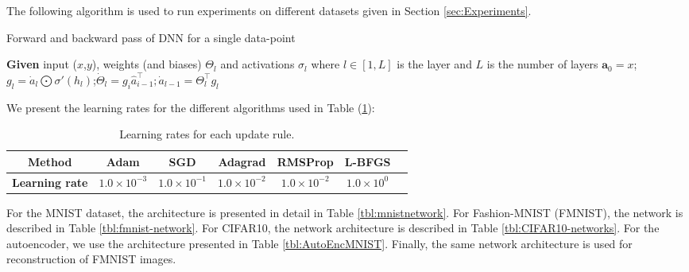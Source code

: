 The following algorithm is used to run experiments on different datasets given in Section \ref{sec:Experiments}.

\begin{algorithm}
	\caption{Forward and backward pass of DNN for a single data-point}
	\begin{algorithmic}
		\State \textbf{Given} input ($x$,$y$), weights (and biases) $\Theta_{l}$ and activations $\sigma_l$ where $l \in [1,L]$ is the layer and $L$ is the number of layers
		\State  $\mathbf{a}_0 = x$; 
		\EndFor
		 {$g_l = \dot{a}_l \bigodot \sigma'(h_l)$};{$ \dot{\Theta}_l = g_i \hat{a}^{\top}_{i-1};$}{$\dot{a}_{l-1} = \Theta_l^\top g_l$}
		\EndFor
	\end{algorithmic}\label{alg:DNN}
\end{algorithm}
We present the learning rates for the different algorithms used in Table (\ref{tbl:lr}):
\begin{table}[h]
	\centering
	\begin{tabular}{|c|c|c|c|c|c|c|}
		\hline
		\textbf{Method} & 
		Adam &  
		SGD & 
		Adagrad &
		RMSProp & 
		L-BFGS \\
		\hline
		\textbf{Learning rate} & 
		$1.0 \times 10^{-3}$ &
		$1.0 \times 10^{-1}$  & 
		$1.0 \times 10^{-2}$ & 
		$1.0 \times 10^{-2}$ & 
		$1.0 \times 10^0$ \\
		\hline
	\end{tabular}
	\caption{Learning rates for each update rule.}
	\label{tbl:lr}
\end{table}

For the MNIST dataset, the architecture is presented in detail in Table \ref{tbl:mnistnetwork}.
For Fashion-MNIST (FMNIST), the network is described in Table \ref{tbl:fmnist-network}.
For CIFAR10, the network architecture is described in Table \ref{tbl:CIFAR10-networks}.
For the autoencoder, we use the architecture presented in Table \ref{tbl:AutoEncMNIST}.
Finally, the same network architecture is used for reconstruction of FMNIST images.


